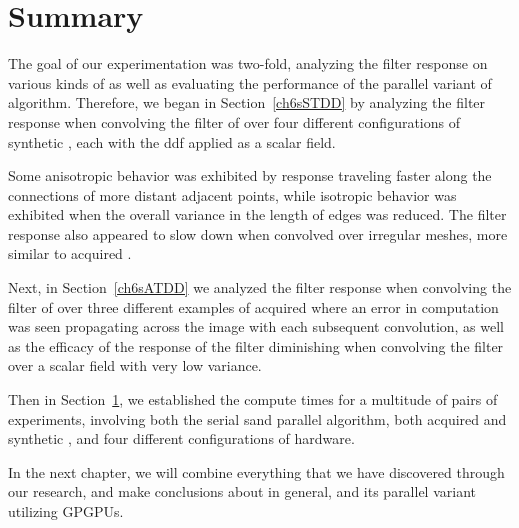 %
%
%
%
%
%
\section{Summary}
The goal of our experimentation was two-fold, analyzing the filter response on various kinds of \tdd{} as well as evaluating the performance of the parallel variant of  algorithm. Therefore, we began in Section~\ref{ch6sSTDD} by analyzing the filter response when convolving the filter of over four different configurations of synthetic \tdd{}, each with the \gls{ddf} applied as a scalar field. 

Some anisotropic behavior was exhibited by  response traveling faster along the connections of more distant adjacent points, while isotropic behavior was exhibited when the overall variance in the length of edges was reduced. The filter response also appeared to slow down when convolved over irregular meshes, more similar to acquired \tdd{}.

Next, in Section~\ref{ch6sATDD} we analyzed the filter response when convolving the filter of over three different examples of acquired \tdd{} where an error in computation was seen propagating across the image with each subsequent convolution, as well as the efficacy of the response of the filter diminishing when convolving the filter over a scalar field with very low variance.

Then in Section~\ref{}, we established the compute times for a multitude of pairs of experiments, involving both the serial sand parallel algorithm, both acquired and synthetic \tdd{}, and four different configurations of hardware.

In the next chapter, we will combine everything that we have discovered through our research, and make conclusions about  in general, and its parallel variant utilizing \glspl{GPGPU}.
